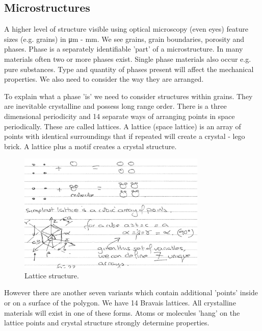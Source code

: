 \documentclass[class=report, crop=false, 12pt,a4paper]{standalone}
\begin{document}
\subsection{Microstructures}
A higher level of structure visible using optical microscopy (even eyes) feature sizes (e.g. grains) in \si{\micro\meter} - \si{\milli\meter}. We see grains, grain boundaries, porosity and phases. Phase is a separately identifiable 'part' of a microstructure. In many materials often two or more phases exist. Single phase materials also occur e.g. pure substances. Type and quantity of phases present will affect the mechanical properties. We also need to consider the way they are arranged.

To explain what a phase 'is' we need to consider structures within grains. They are inevitable crystalline and possess long range order. There is a three dimensional periodicity and 14 separate ways of arranging points in space periodically. These are called lattices. A lattice (space lattice) is an array of points with identical surroundings that if repeated will create a crystal - lego brick. A lattice plus a motif creates a crystal structure.
\begin{figure}
  \centering
  \includegraphics[width = 0.8\textwidth]{../img/latticeStructure}
  \caption{Lattice structure.}
\end{figure}
However there are another seven variants which contain additional 'points' inside or on a surface of the polygon. We have 14 Bravais lattices. All crystalline materials will exist in one of these forms. Atoms or molecules 'hang' on the lattice points and crystal structure strongly determine properties.
\end{document}
